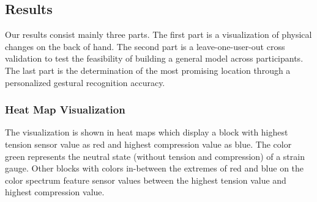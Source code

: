 \documentclass{sigchi}
\begin{document}
\subsection{Results}

Our results consist mainly three parts. The first part is a visualization of physical changes on the back of hand. The second part is a leave-one-user-out cross validation to test the feasibility of building a general model across participants. The last part is the determination of the most promising location through a personalized gestural recognition accuracy.


\subsubsection{Heat Map Visualization}
The visualization is shown in heat maps which display a block with highest tension sensor value as red and highest compression value as blue. The color green represents the neutral state (without tension and compression) of a strain gauge. Other blocks with colors in-between the extremes of red and blue on the color spectrum feature sensor values between the highest tension value and highest compression value.
\end{document}
